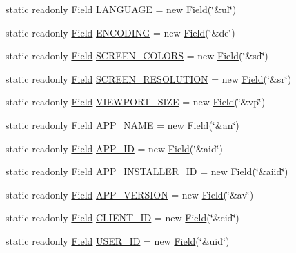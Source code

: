 \begin{DoxyCompactItemize}
\item 
static readonly \hyperlink{class_field}{Field} \hyperlink{class_fields_a3900a5b9ed537b79ffffd3424b6f8305}{L\+A\+N\+G\+U\+A\+GE} = new \hyperlink{class_field}{Field}(\char`\"{}\&ul\char`\"{})
\item 
static readonly \hyperlink{class_field}{Field} \hyperlink{class_fields_a7dcf4e4b2e42357de296666c51509ffd}{E\+N\+C\+O\+D\+I\+NG} = new \hyperlink{class_field}{Field}(\char`\"{}\&de\char`\"{})
\item 
static readonly \hyperlink{class_field}{Field} \hyperlink{class_fields_a3978318a175474d5a9d610625de07f7c}{S\+C\+R\+E\+E\+N\+\_\+\+C\+O\+L\+O\+RS} = new \hyperlink{class_field}{Field}(\char`\"{}\&sd\char`\"{})
\item 
static readonly \hyperlink{class_field}{Field} \hyperlink{class_fields_a5d242985c517d7af117a1bec09f16bcd}{S\+C\+R\+E\+E\+N\+\_\+\+R\+E\+S\+O\+L\+U\+T\+I\+ON} = new \hyperlink{class_field}{Field}(\char`\"{}\&sr\char`\"{})
\item 
static readonly \hyperlink{class_field}{Field} \hyperlink{class_fields_a7e3fe01e18ccd75ae06679a6cd8943d2}{V\+I\+E\+W\+P\+O\+R\+T\+\_\+\+S\+I\+ZE} = new \hyperlink{class_field}{Field}(\char`\"{}\&vp\char`\"{})
\item 
static readonly \hyperlink{class_field}{Field} \hyperlink{class_fields_a6b13fdc3350489a5c28b21d43d68aee8}{A\+P\+P\+\_\+\+N\+A\+ME} = new \hyperlink{class_field}{Field}(\char`\"{}\&an\char`\"{})
\item 
static readonly \hyperlink{class_field}{Field} \hyperlink{class_fields_a4efa12f36c33ae59d288b7ebfe7e7a68}{A\+P\+P\+\_\+\+ID} = new \hyperlink{class_field}{Field}(\char`\"{}\&aid\char`\"{})
\item 
static readonly \hyperlink{class_field}{Field} \hyperlink{class_fields_ad7575def8e6d0f5230d36037614948ec}{A\+P\+P\+\_\+\+I\+N\+S\+T\+A\+L\+L\+E\+R\+\_\+\+ID} = new \hyperlink{class_field}{Field}(\char`\"{}\&aiid\char`\"{})
\item 
static readonly \hyperlink{class_field}{Field} \hyperlink{class_fields_add0fc334b9c08b1b7a8b06275a6d8cb5}{A\+P\+P\+\_\+\+V\+E\+R\+S\+I\+ON} = new \hyperlink{class_field}{Field}(\char`\"{}\&av\char`\"{})
\item 
static readonly \hyperlink{class_field}{Field} \hyperlink{class_fields_a6c040fc1a497b336f7e018add2d4377c}{C\+L\+I\+E\+N\+T\+\_\+\+ID} = new \hyperlink{class_field}{Field}(\char`\"{}\&cid\char`\"{})
\item 
static readonly \hyperlink{class_field}{Field} \hyperlink{class_fields_a808226a0d794ed4f7d531a9eac3cd94f}{U\+S\+E\+R\+\_\+\+ID} = new \hyperlink{class_field}{Field}(\char`\"{}\&uid\char`\"{})

\end{DoxyCompactItemize}
